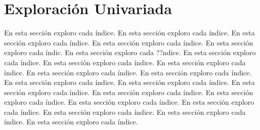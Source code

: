 \documentclass{article}
\begin{document}
\section{Exploración Univariada}\label{univariada}

En esta sección exploro cada índice. En esta sección exploro cada índice. En esta sección exploro cada índice. En esta sección exploro cada índice. En esta sección exploro cada índic. En esta sección exploro cada ??ndice. En esta sección exploro cada índice. En esta sección exploro cada índice. En esta sección exploro cada índice. En esta sección exploro cada índice. En esta sección exploro cada índice. En esta sección exploro cada índice. En esta sección exploro cada índice. En esta sección exploro cada índice. En esta sección exploro cada índice. En esta sección exploro cada índice. En esta sección exploro cada índice. En esta sección exploro cada índice. En esta sección exploro cada índice. En esta sección exploro cada índice. En esta sección exploro cada índice.
\end{document}

